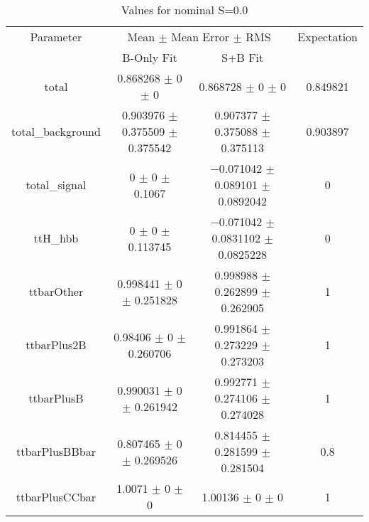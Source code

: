 \begin{table}
\centering
\caption{Values for nominal S=0.0}
\begin{tabular}{cccc}
\toprule
Parameter & \multicolumn{2}{c}{Mean $\pm$ Mean Error $\pm$ RMS} & Expectation\\
 & B-Only Fit & S+B Fit & \\
\midrule
total & \num{0.868268} $\pm$ \num{0} $\pm$ \num{0} & \num{0.868728} $\pm$ \num{0} $\pm$ \num{0} & \num{0.849821}\\
total\_background & \num{0.903976} $\pm$ \num{0.375509} $\pm$ \num{0.375542} & \num{0.907377} $\pm$ \num{0.375088} $\pm$ \num{0.375113} & \num{0.903897}\\
total\_signal & \num{0} $\pm$ \num{0} $\pm$ \num{0.1067} & \num{-0.071042} $\pm$ \num{0.089101} $\pm$ \num{0.0892042} & \num{0}\\
ttH\_hbb & \num{0} $\pm$ \num{0} $\pm$ \num{0.113745} & \num{-0.071042} $\pm$ \num{0.0831102} $\pm$ \num{0.0825228} & \num{0}\\
ttbarOther & \num{0.998441} $\pm$ \num{0} $\pm$ \num{0.251828} & \num{0.998988} $\pm$ \num{0.262899} $\pm$ \num{0.262905} & \num{1}\\
ttbarPlus2B & \num{0.98406} $\pm$ \num{0} $\pm$ \num{0.260706} & \num{0.991864} $\pm$ \num{0.273229} $\pm$ \num{0.273203} & \num{1}\\
ttbarPlusB & \num{0.990031} $\pm$ \num{0} $\pm$ \num{0.261942} & \num{0.992771} $\pm$ \num{0.274106} $\pm$ \num{0.274028} & \num{1}\\
ttbarPlusBBbar & \num{0.807465} $\pm$ \num{0} $\pm$ \num{0.269526} & \num{0.814455} $\pm$ \num{0.281599} $\pm$ \num{0.281504} & \num{0.8}\\
ttbarPlusCCbar & \num{1.0071} $\pm$ \num{0} $\pm$ \num{0} & \num{1.00136} $\pm$ \num{0} $\pm$ \num{0} & \num{1}\\
\bottomrule
\end{tabular}
\end{table}